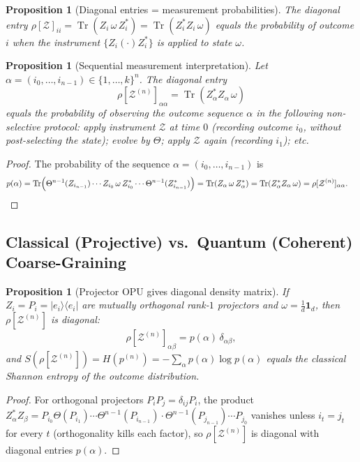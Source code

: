 \documentclass[12pt,a4paper]{article}
\newtheorem{proposition}[theorem]{Proposition}
\DeclareMathOperator{\Tr}{Tr}
\begin{document}
\begin{proposition}[Diagonal entries = measurement probabilities]
\label{prop:diag_prob}
The diagonal entry $\rho[\mathcal{Z}]_{ii}=\Tr(Z_i\,\omega\,Z_i^*)=\Tr(Z_i^*Z_i\,\omega)$
equals the probability of outcome $i$ when the instrument $\{Z_i(\cdot)Z_i^*\}$ is applied
to state $\omega$.
\end{proposition}

\begin{proposition}[Sequential measurement interpretation]
\label{prop:seq_meas}
Let $\alpha=(i_0,\ldots,i_{n-1})\in\{1,\ldots,k\}^n$.  The diagonal entry
\[
  \rho[\mathcal{Z}^{(n)}]_{\alpha\alpha}
  = \Tr\!\left(Z_\alpha^*Z_\alpha\,\omega\right)
\]
equals the probability of observing the outcome sequence $\alpha$ in the following
\emph{non-selective} protocol: apply instrument $\mathcal{Z}$ at time $0$
(recording outcome $i_0$, without post-selecting the state); evolve by $\Theta$;
apply $\mathcal{Z}$ again (recording $i_1$); etc.
\end{proposition}

\begin{proof}
The probability of the sequence $\alpha=(i_0,\ldots,i_{n-1})$ is
\begin{align*}
  p(\alpha)
  &= \Tr\!\left(
     \Theta^{n-1}(Z_{i_{n-1}})\cdots Z_{i_0}\,\omega\,
     Z_{i_0}^*\cdots\Theta^{n-1}(Z_{i_{n-1}}^*)\right)
   = \Tr(Z_\alpha\,\omega\,Z_\alpha^*)
   = \Tr(Z_\alpha^*Z_\alpha\,\omega)
   = \rho[\mathcal{Z}^{(n)}]_{\alpha\alpha}. \qedhere
\end{align*}
\end{proof}

\subsection{Classical (Projective) vs.\ Quantum (Coherent) Coarse-Graining}

\begin{proposition}[Projector OPU gives diagonal density matrix]
\label{prop:proj_diag}
If $Z_i=P_i=|e_i\rangle\langle e_i|$ are mutually orthogonal rank-$1$ projectors and
$\omega=\frac{1}{d}\mathbf{1}_d$, then $\rho[\mathcal{Z}^{(n)}]$ is diagonal:
\[
  \rho[\mathcal{Z}^{(n)}]_{\alpha\beta} = p(\alpha)\,\delta_{\alpha\beta},
\]
and $S(\rho[\mathcal{Z}^{(n)}]) = H(p^{(n)}) = -\sum_\alpha p(\alpha)\log p(\alpha)$
equals the classical Shannon entropy of the outcome distribution.
\end{proposition}

\begin{proof}
For orthogonal projectors $P_i P_j=\delta_{ij}P_i$, the product
$Z_\alpha^*Z_\beta = P_{i_0}\Theta(P_{i_1})\cdots\Theta^{n-1}(P_{i_{n-1}})
\cdot\Theta^{n-1}(P_{j_{n-1}})\cdots P_{j_0}$
vanishes unless $i_t=j_t$ for every $t$ (orthogonality kills each factor), so
$\rho[\mathcal{Z}^{(n)}]$ is diagonal with diagonal entries $p(\alpha)$.
\end{proof}
\end{document}
